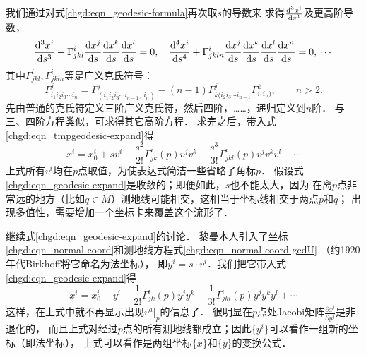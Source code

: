 我们通过对式\eqref{chgd:eqn_geodesic-formula}再次取$s$的导数来
求得$\frac{{\rm d}^3 x^i}{{\rm d} s^3}$及更高阶导数，
\begin{equation}
    \frac{{\rm d}^3 x^i}{{\rm d} s^3}+\Gamma^{i}_{jkl}\frac{{\rm d} x^j}{{\rm d} s}
    \frac{{\rm d} x^k}{{\rm d} s}\frac{{\rm d} x^l}{{\rm d} s} =0 , \quad
    \frac{{\rm d}^4 x^i}{{\rm d} s^4}+\Gamma^{i}_{jkln}\frac{{\rm d} x^j}{{\rm d} s}
    \frac{{\rm d} x^k}{{\rm d} s}\frac{{\rm d} x^l}{{\rm d} s}\frac{{\rm d} x^n}{{\rm d} s} =0,
    \, \cdots
\end{equation}
其中$\Gamma^{i}_{jkl},\Gamma^{i}_{jkln}$等是广义克氏符号：
\begin{equation}\label{chgd:eqn_generalized-Christoffel}
    \Gamma^{j}_{i_1i_2i_3\cdots i_n} =  \Gamma^{j}_{(i_1i_2i_3\cdots i_{n-1},\ i_n)}
    - (n-1) \Gamma^{j}_{k(i_2i_3\cdots i_{n-1}}  \Gamma^{k}_{i_1i_n)},\qquad n>2 .
\end{equation}
先由普通的克氏符定义三阶广义克氏符，然后四阶，……，递归定义到$n$阶．
与三、四阶方程类似，可求得其它高阶方程．
求完之后，带入式\eqref{chgd:eqn_tmpgeodesic-expand}得
\begin{equation}\label{chgd:eqn_geodesic-expand}
    x^i = x^i_0 + s v^i  - \frac{s^2}{2!} \Gamma_{jk}^i(p) v^j v^k
        - \frac{s^3}{3!}  \Gamma^{i}_{jkl}(p) v^j v^k v^l
        - \cdots
\end{equation}
上式所有$v^i$均在$p$点取值，为使表达式简洁一些省略了角标$p$．
假设式\eqref{chgd:eqn_geodesic-expand}是收敛的；即便如此，$s$也不能太大，因为
在离$p$点非常远的地方（比如$q\in M$）测地线可能相交，这相当于坐标线相交于两点$p$和$q$；
出现多值性，需要增加一个坐标卡来覆盖这个流形了．



继续式\eqref{chgd:eqn_geodesic-expand}的讨论．
黎曼本人引入了坐标\eqref{chgd:eqn_normal-coord}和测地线方程式\eqref{chgd:eqn_normal-coord-gedU}
（约1920年代Birkhoff将它命名为法坐标），
即$ y^i = s\cdot v^i$．我们把它带入式\eqref{chgd:eqn_geodesic-expand}得
\begin{equation}
    x^i = x^i_0 + y^i  - \frac{1}{2!} \Gamma_{jk}^i(p) y^j y^k
    - \frac{1}{3!}  \Gamma^{i}_{jkl}(p) y^j y^k y^l + \cdots
\end{equation}
这样，在上式中就不再显示出现$v^a|_p$的信息了．
很明显在$p$点处Jacobi矩阵$\frac{\partial x^i}{\partial y^j}$是非退化的，
而且上式对经过$p$点的所有测地线都成立；因此$\{y^i\}$可以看作一组新的坐标（即法坐标），
上式可以看作是两组坐标$\{x\}$和$\{y\}$的变换公式．

